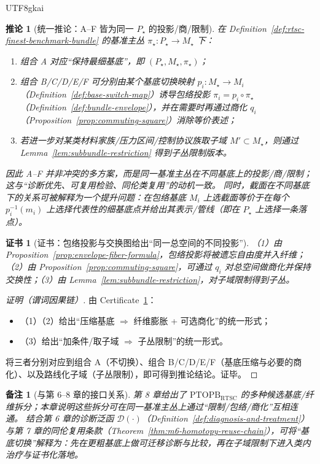 \documentclass[12pt]{article}
\newtheorem{corollary}{推论}[section]
\newtheorem{remark}{备注}[section]
\newtheorem{certificate}{证书}[section]
\newcommand{\PTOPB}{\ensuremath{\mathrm{PTOPB}}}
\begin{document}
\begin{CJK*}{UTF8}{gkai}
\begin{corollary}[统一推论：A--F 皆为同一 $P_\star$ 的投影/商/限制]
\label{cor:af-unified}
在 Definition~\ref{def:rtsc-finest-benchmark-bundle} 的基准主丛 $\pi_\star:P_\star\to M_\star$ 下：
\begin{enumerate}
  \item 组合 A 对应“保持最细基底”，即 $(P_\star,M_\star,\pi_\star)$；
  \item 组合 B/C/D/E/F 可分别由某个基底切换映射 $p_i:M_\star\to M_i$（Definition~\ref{def:base-switch-map}）诱导包络投影
    $\pi_i=p_i\circ\pi_\star$（Definition~\ref{def:bundle-envelope}），并在需要时再通过商化 $q_i$（Proposition~\ref{prop:commuting-square}）消除等价表述；
  \item 若进一步对某类材料家族/压力区间/控制协议族取子域 $M'\subset M_\star$，则通过 Lemma~\ref{lem:subbundle-restriction} 得到子丛限制版本。
\end{enumerate}
因此 A--F 并非冲突的多方案，而是同一基准主丛在不同基底上的投影/商/限制；这与“诊断优先、可复用检验、同伦类复用”的动机一致。
同时，截面在不同基底下的关系可被解释为一个提升问题：在包络基底 $M_i$ 上选截面等价于在每个 $p_i^{-1}(m_i)$ 上选择代表性的细基底点并给出其表示/管线（即在 $P_\star$ 上选择一条落点）。
\end{corollary}

\begin{certificate}[证书：包络投影与交换图给出“同一总空间的不同投影”]
\label{cert:af-unified}
（1）由 Proposition~\ref{prop:envelope-fiber-formula}，包络投影将被遗忘自由度并入纤维；（2）由 Proposition~\ref{prop:commuting-square}，可通过
  $q_i$ 对总空间做商化并保持交换性；（3）由 Lemma~\ref{lem:subbundle-restriction}，对子域限制得到子丛。
\end{certificate}

\begin{proof}[证明（谓词因果链）]
由 Certificate~\ref{cert:af-unified}：
\begin{itemize}
  \item（1）（2）给出“压缩基底 $\Rightarrow$ 纤维膨胀 + 可选商化”的统一形式；
  \item（3）给出“加条件/取子域 $\Rightarrow$ 子丛限制”的统一形式。
\end{itemize}
将三者分别对应到组合 A（不切换）、组合 B/C/D/E/F（基底压缩与必要的商化）、以及路线化子域（子丛限制），即可得到推论结论。证毕。
\end{proof}

\begin{remark}[与第 6--8 章的接口关系]
第 8 章给出了 \PTOPB$_{\mathrm{RTSC}}$ 的多种候选基底/纤维拆分；本章说明这些拆分可在同一基准主丛上通过“限制/包络/商化”互相连通。
结合第 6 章的诊断泛函 $\mathcal{D}(\cdot)$（Definition~\ref{def:diagnosis-and-treatment}）与第 7 章的同伦复用条款（Theorem~\ref{thm:m6-homotopy-reuse-chain}），可将“基底切换”解释为：先在更粗基底上做可迁移诊断与比较，再在子域限制下进入类内治疗与证书化落地。
\end{remark}


\end{CJK*}
\end{document}
